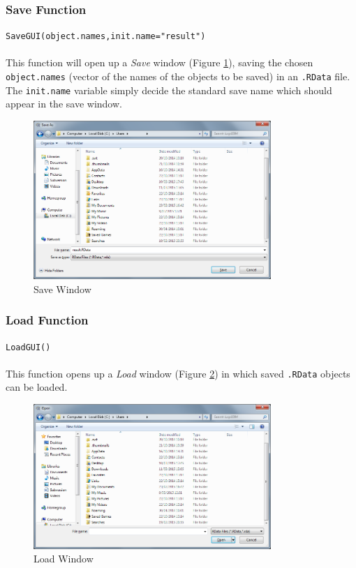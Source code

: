 \documentclass[a4paper]{article}\usepackage[]{graphicx}\usepackage[]{color}
\begin{document}
\subsubsection{Save Function}
\texttt{SaveGUI(object.names,init.name="result")}\\ \\
This function will open up a {\it Save} window (Figure \ref{saveGUI}), saving
the chosen \verb|object.names| (vector of the names of the objects to be saved)
in an \verb|.RData| file. The \verb|init.name| variable simply decide the
standard save name which should appear in the save window.
\begin{figure}[H]
\centering
\includegraphics[width=9cm]{figures/saveGUI.png}
\caption{Save Window \label{saveGUI}}
\end{figure}

\subsubsection{Load Function}
\texttt{LoadGUI()}\\ \\
This function opens up a {\it Load} window (Figure \ref{loadGUI}) in which saved
\verb|.RData| objects can be loaded.

\begin{figure}[H]
\centering
\includegraphics[width=9cm]{figures/loadGUI.png}
\caption{Load Window \label{loadGUI}}
\end{figure}
\end{document}
